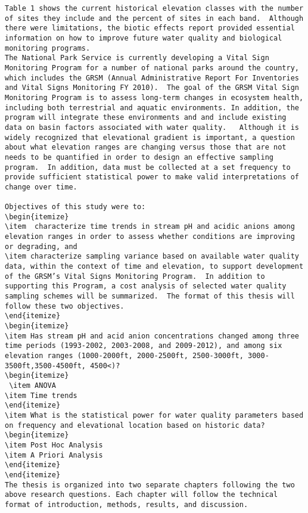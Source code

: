 \begin{verbatim}
Table 1 shows the current historical elevation classes with the number of sites they include and the percent of sites in each band.  Although there were limitations, the biotic effects report provided essential information on how to improve future water quality and biological monitoring programs.
The National Park Service is currently developing a Vital Sign Monitoring Program for a number of national parks around the country, which includes the GRSM (Annual Administrative Report For Inventories and Vital Signs Monitoring FY 2010).  The goal of the GRSM Vital Sign Monitoring Program is to assess long-term changes in ecosystem health, including both terrestrial and aquatic environments. In addition, the program will integrate these environments and and include existing data on basin factors associated with water quality.   Although it is widely recognized that elevational gradient is important, a question about what elevation ranges are changing versus those that are not needs to be quantified in order to design an effective sampling program.  In addition, data must be collected at a set frequency to provide sufficient statistical power to make valid interpretations of change over time. 

Objectives of this study were to:
\begin{itemize}
\item  characterize time trends in stream pH and acidic anions among elevation ranges in order to assess whether conditions are improving or degrading, and 
\item characterize sampling variance based on available water quality data, within the context of time and elevation, to support development of the GRSM’s Vital Signs Monitoring Program.  In addition to supporting this Program, a cost analysis of selected water quality sampling schemes will be summarized.  The format of this thesis will follow these two objectives.  
\end{itemize}
\begin{itemize}
\item Has stream pH and acid anion concentrations changed among three time periods (1993-2002, 2003-2008, and 2009-2012), and among six elevation ranges (1000-2000ft, 2000-2500ft, 2500-3000ft, 3000-3500ft,3500-4500ft, 4500<)?
\begin{itemize}
 \item ANOVA
\item Time trends
\end{itemize}
\item What is the statistical power for water quality parameters based on frequency and elevational location based on historic data?
\begin{itemize}
\item Post Hoc Analysis
\item A Priori Analysis
\end{itemize}
\end{itemize}
The thesis is organized into two separate chapters following the two above research questions. Each chapter will follow the technical format of introduction, methods, results, and discussion.  
\end{verbatim}